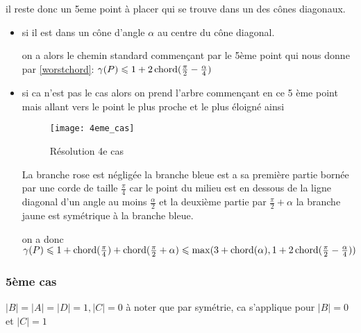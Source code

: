 il reste donc un 5eme point à placer qui se trouve dans un des cônes diagonaux.

\begin{itemize}

\item \label{4cas1} si il est dans un cône d'angle $\alpha$ au centre du cône diagonal.

on a alors le chemin standard commençant par le 5ème point qui nous donne par \ref{worstchord}: $\gamma(P) \leqslant 1 + 2\operatorname{chord}(\frac{\pi}{2} - \frac{\alpha}{4})$

\item \label{4cas2} si ca n'est pas le cas alors on prend l'arbre commençant en ce 5 ème point mais allant vers le point le plus proche et le plus éloigné ainsi

\begin{figure}[h!]
  \centering
  \texttt{[image: 4eme\_cas]}
  \caption{Résolution 4e cas}
  \label{fig:4eme_cas}
\end{figure}

La branche rose est négligée
la branche bleue est a sa première partie bornée par une corde de taille $\frac{\pi}{4}$ car le point du milieu est en dessous de la ligne diagonal d'un angle au moins $\frac{\alpha}{2}$ et la deuxième partie par $\frac{\pi}{2} + \alpha$
la branche jaune est symétrique à la branche bleue.

on a donc $\gamma(P) \leqslant 1 + \operatorname{chord}(\frac{\pi}{4}) + \operatorname{chord}(\frac{\pi}{2} + \alpha) \leqslant \max(3 + \operatorname{chord}(\alpha), 1 + 2\operatorname{chord}(\frac{\pi}{2} - \frac{\alpha}{4}))$

\end{itemize}

\subsubsection*{5ème cas}\label{5cas} $|B| = |A| = |D| = 1, |C| = 0$
à noter que par symétrie, ca s'applique pour $|B| = 0$ et $|C| = 1$

